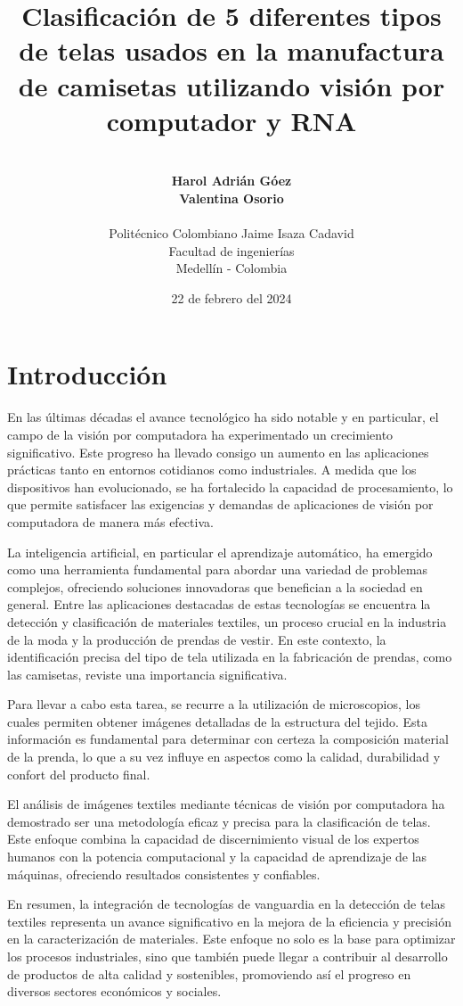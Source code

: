 \documentclass{article}
\title{\textbf{ Clasificación de 5 diferentes tipos de telas usados en la manufactura de camisetas utilizando visión por computador y RNA }}
\author{
    \vspace{8cm} \\
    \textbf{Harol Adrián Góez } \\
    \textbf{Valentina Osorio} \\
    \vspace{2cm} \\
    \small Politécnico Colombiano Jaime Isaza Cadavid\\
    \small Facultad de ingenierías\\
    \small Medellín - Colombia
    \date{ 22 de febrero del 2024 }
}
\begin{document}
\maketitle
\pagebreak

\section{Introducción}

En las últimas décadas el avance tecnológico ha sido notable y en particular, el campo de la visión por computadora 
ha experimentado un crecimiento significativo. Este progreso ha llevado consigo un aumento en las aplicaciones prácticas
tanto en entornos cotidianos como industriales. A medida que los dispositivos han evolucionado,
se ha fortalecido la capacidad de procesamiento, lo que permite satisfacer las exigencias y 
demandas de aplicaciones de visión por computadora de manera más efectiva.

La inteligencia artificial, en particular el aprendizaje automático, ha emergido como una herramienta fundamental 
para abordar una variedad de problemas complejos, ofreciendo soluciones innovadoras que benefician a la sociedad en general. 
Entre las aplicaciones destacadas de estas tecnologías se encuentra la detección y clasificación de materiales textiles,
un proceso crucial en la industria de la moda y la producción de prendas de vestir.
En este contexto, la identificación precisa del tipo de tela utilizada en la fabricación de prendas, como las camisetas, 
reviste una importancia significativa.

Para llevar a cabo esta tarea, se recurre a la utilización de microscopios, 
los cuales permiten obtener imágenes detalladas de la estructura del tejido. Esta información es fundamental 
para determinar con certeza la composición material de la prenda, lo que a su vez influye en aspectos como la calidad,
durabilidad y confort del producto final.

El análisis de imágenes textiles mediante técnicas de visión por computadora ha demostrado ser una metodología 
eficaz y precisa para la clasificación de telas. Este enfoque combina la capacidad de discernimiento visual 
de los expertos humanos con la potencia computacional y la capacidad de aprendizaje de las máquinas,
ofreciendo resultados consistentes y confiables.

En resumen, la integración de tecnologías de vanguardia en la detección de telas textiles representa un avance 
significativo en la mejora de la eficiencia y precisión en la caracterización de materiales. 
Este enfoque no solo es la base para optimizar los procesos industriales, sino que también puede llegar a contribuir al desarrollo de productos de alta calidad
y sostenibles, promoviendo así el progreso en diversos sectores económicos y sociales.
\end{document}

